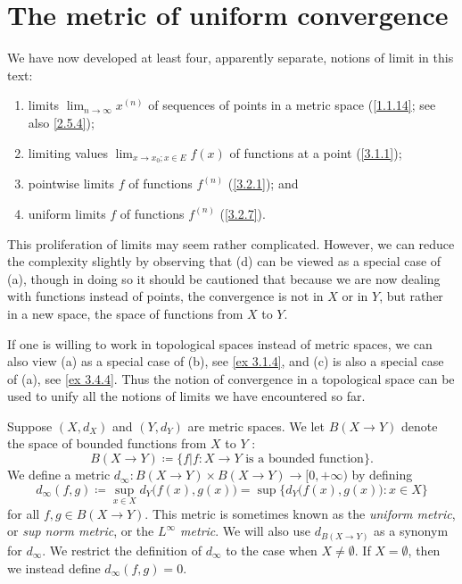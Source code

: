 \section{The metric of uniform convergence}\label{sec 3.4}

\begin{note}
  We have now developed at least four, apparently separate, notions of limit in this text:
  \begin{enumerate}
    \item limits \(\lim_{n \to \infty} x^{(n)}\) of sequences of points in a metric space
          (\cref{1.1.14};
          see also \cref{2.5.4});
    \item limiting values \(\lim_{x \to x_0 ; x \in E} f(x)\) of functions at a point
          (\cref{3.1.1});
    \item pointwise limits \(f\) of functions \(f^{(n)}\)
          (\cref{3.2.1});
          and
    \item uniform limits \(f\) of functions \(f^{(n)}\)
          (\cref{3.2.7}).
  \end{enumerate}

  This proliferation of limits may seem rather complicated.
  However, we can reduce the complexity slightly by observing that (d) can be viewed as a special case of (a), though in doing so it should be cautioned that because we are now dealing with functions instead of points, the convergence is not in \(X\) or in \(Y\), but rather in a new space, the space of functions from \(X\) to \(Y\).
\end{note}

\begin{remark}\label{3.4.1}
  If one is willing to work in topological spaces instead of metric spaces, we can also view (a) as a special case of (b), see \cref{ex 3.1.4}, and (c) is also a special case of (a), see \cref{ex 3.4.4}.
  Thus the notion of convergence in a topological space can be used to unify all the notions of limits we have encountered so far.
\end{remark}

\begin{definition}\label{3.4.2}
  Suppose \((X, d_X)\) and \((Y, d_Y)\) are metric spaces.
  We let \(B(X \to Y)\) denote the space of bounded functions from \(X\) to \(Y\) :
  \[
    B(X \to Y) \coloneqq \{f | f : X \to Y \text{ is a bounded function}\}.
  \]
  We define a metric \(d_\infty : B(X \to Y) \times B(X \to Y) \to [0, +\infty)\) by defining
  \[
    d_\infty(f, g) \coloneqq \sup_{x \in X} d_Y\big(f(x), g(x)\big) = \sup\Big\{d_Y\big(f(x), g(x)\big) : x \in X\Big\}
  \]
  for all \(f, g \in B(X \to Y)\).
  This metric is sometimes known as the \emph{uniform metric}, or \emph{sup norm metric}, or the \emph{\(L^\infty\) metric}.
  We will also use \(d_{B(X \to Y)}\) as a synonym for \(d_\infty\).
  We restrict the definition of \(d_\infty\) to the case when \(X \neq \emptyset\).
  If \(X = \emptyset\), then we instead define \(d_\infty(f, g) = 0\).
\end{definition}

